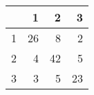 \begin{tabular}{rrrr}
  \hline
 & 1 & 2 & 3 \\ 
  \hline
1 &  26 &   8 &   2 \\ 
  2 &   4 &  42 &   5 \\ 
  3 &   3 &   5 &  23 \\ 
   \hline
\end{tabular}
